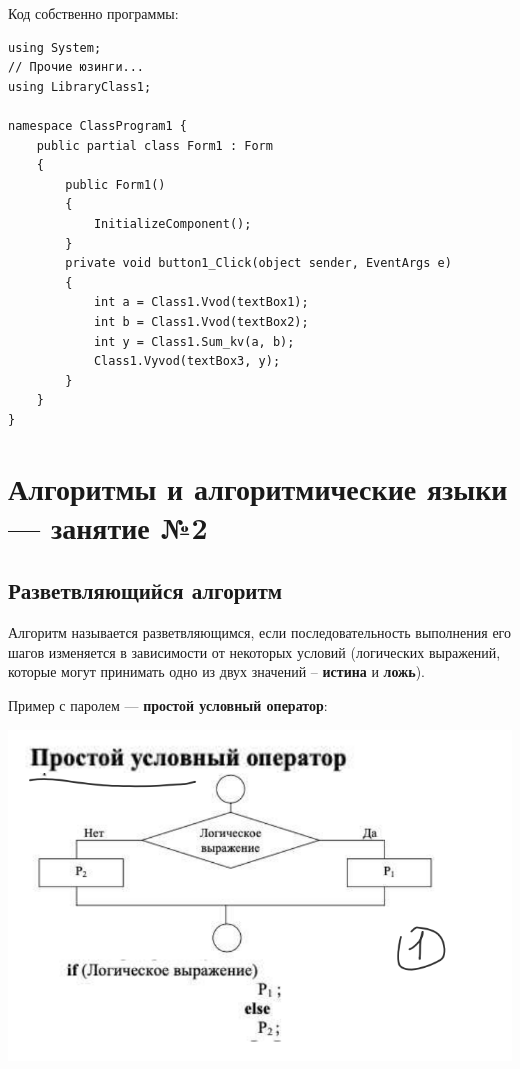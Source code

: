 \documentclass{article}
\begin{document}
Код собственно программы:

\begin{verbatim}
using System;
// Прочие юзинги...
using LibraryClass1;

namespace ClassProgram1 {
    public partial class Form1 : Form
    {
        public Form1()
        {
            InitializeComponent();
        }
        private void button1_Click(object sender, EventArgs e)
        {
            int a = Class1.Vvod(textBox1);
            int b = Class1.Vvod(textBox2);
            int y = Class1.Sum_kv(a, b);
            Class1.Vyvod(textBox3, y);
        }
    }
}
\end{verbatim}

\pagebreak
\section{Алгоритмы и алгоритмические языки — занятие №2}

\subsection{Разветвляющийся алгоритм}

Алгоритм называется разветвляющимся, если последовательность выполнения его шагов изменяется в зависимости от некоторых условий (логических выражений, которые могут принимать одно из двух значений – \textbf{истина} и \textbf{ложь}).

Пример с паролем — \textbf{простой условный оператор}:

\begin{center}
    \includegraphics{images/image_00.png}
\end{center}
\end{document}
